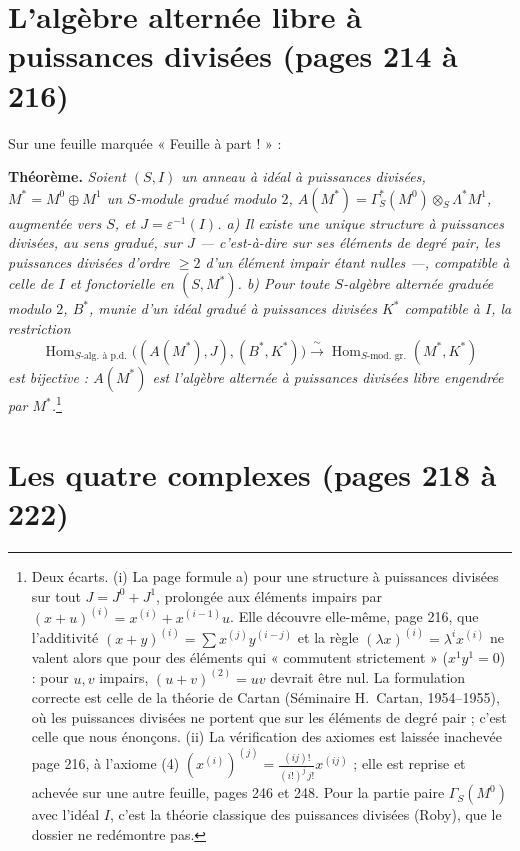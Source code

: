 \documentclass[11pt,a4paper]{article}
\begin{document}
\section*{L'algèbre alternée libre à puissances divisées (pages 214 à 216)}

Sur une feuille marquée « Feuille à part ! » :

\textbf{Théorème.} \emph{Soient $(S, I)$ un anneau à idéal à puissances
divisées, $M^* = M^0 \oplus M^1$ un $S$-module gradué modulo $2$, $A(M^*) =
\Gamma^*_S(M^0) \otimes_S \Lambda^* M^1$, augmentée vers $S$, et $J =
\varepsilon^{-1}(I)$. a) Il existe une unique structure à puissances divisées,
au sens gradué, sur $J$ — c'est-à-dire sur ses éléments de degré pair, les
puissances divisées d'ordre $\geq 2$ d'un élément impair étant nulles —,
compatible à celle de $I$ et fonctorielle en $(S, M^*)$. b) Pour toute
$S$-algèbre alternée graduée modulo $2$, $B^*$, munie d'un idéal gradué à
puissances divisées $K^*$ compatible à $I$, la restriction}
\[
\operatorname{Hom}_{S\text{-alg.\ à p.d.}}\bigl((A(M^*), J), (B^*, K^*)\bigr) \xrightarrow{\ \sim\ } \operatorname{Hom}_{S\text{-mod.\ gr.}}(M^*, K^*)
\]
\emph{est bijective : $A(M^*)$ est l'algèbre alternée à puissances divisées
libre engendrée par $M^*$.}\footnote{Deux écarts. (i) La page formule a) pour
une structure à puissances divisées sur tout $J = J^0 + J^1$, prolongée aux
éléments impairs par $(x + u)^{(i)} = x^{(i)} + x^{(i-1)}u$. Elle découvre
elle-même, page 216, que l'additivité $(x+y)^{(i)} = \sum x^{(j)}y^{(i-j)}$ et la
règle $(\lambda x)^{(i)} = \lambda^i x^{(i)}$ ne valent alors que pour des
éléments qui « commutent strictement » ($x^1y^1 = 0$) : pour $u, v$ impairs,
$(u+v)^{(2)} = uv$ devrait être nul. La formulation correcte est celle de la
théorie de Cartan (Séminaire H.~Cartan, 1954--1955), où les puissances divisées
ne portent que sur les éléments de degré pair ; c'est celle que nous
énonçons. (ii) La vérification des axiomes est laissée inachevée page 216, à
l'axiome (4) $(x^{(i)})^{(j)} = \frac{(ij)!}{(i!)^j\,j!}x^{(ij)}$ ; elle est
reprise et achevée sur une autre feuille, pages 246 et 248. Pour la partie
paire $\Gamma_S(M^0)$ avec l'idéal $I$, c'est la théorie classique des
puissances divisées (Roby), que le dossier ne redémontre pas.}

\section*{Les quatre complexes (pages 218 à 222)}
\end{document}
